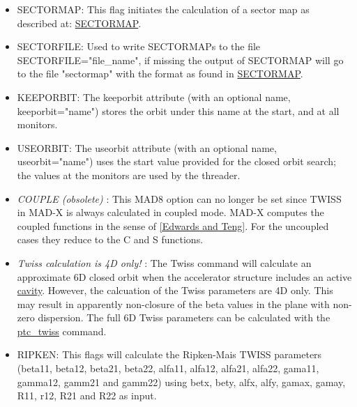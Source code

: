 \begin{itemize}
   \item SECTORMAP: This flag initiates the calculation of a sector
     map as described at:
     \href{../Introduction/sectormap.html}{SECTORMAP}.    

   \item SECTORFILE: Used to write SECTORMAPs to the file
     SECTORFILE="file\_name", if missing the output of SECTORMAP
     will go to the file "sectormap" with the format as found in
     \href{../Introduction/sectormap.html}{SECTORMAP}.    

   \item KEEPORBIT: The keeporbit attribute (with an optional name,
     keeporbit="name") stores the orbit under this name at the
     start, and at all monitors.    

   \item USEORBIT: The useorbit attribute (with an optional name,
     useorbit="name") uses the start value provided for the closed
     orbit search; the values at the monitors are used by the
     threader.    

   \item \textit{COUPLE (obsolete)} : This MAD8 option can no
     longer be set since TWISS in MAD-X is always calculated in
     coupled mode. MAD-X computes the coupled functions in the
     sense of
     \href{../Introduction/bibliography.html#edwards}{[Edwards and
         Teng]}. For the uncoupled cases they reduce to the C and S
     functions.    

   \item \textit{ Twiss calculation is 4D only!} : The Twiss
     command will calculate an approximate 6D closed orbit when the
     accelerator structure includes an active
     \href{../Introduction/cavity.html}{cavity}. However, the
     calcuation of the Twiss parameters are 4D only. This may
     result in apparently non-closure of the beta values in the
     plane with non-zero dispersion. The full 6D Twiss parameters
     can be calculated with the
     \href{../ptc_twiss/ptc_twiss.html}{ptc\_twiss} command.    

   \item RIPKEN: This flags will calculate the Ripken-Mais TWISS
     parameters (beta11, beta12, beta21, beta22, alfa11, alfa12,
     alfa21, alfa22, gama11, gamma12, gamm21 and gamm22) using
     betx, bety, alfx, alfy, gamax, gamay, R11, r12, R21 and R22 as
     input.  

\end{itemize}

